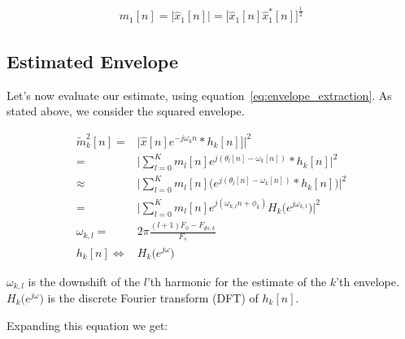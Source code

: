 \documentclass [11pt, proquest] {uwthesis}[2015/03/03]
\begin{document}
\begin{align}
\label{eq:square_root_relationship}
m_1[n] = \Big|\widehat{x}_1[n]\Big| = \Big[ \widehat{x}_1[n] \widehat{x}_1^*[n] \Big]^\frac{1}{2}
\end{align}

\subsection{Estimated Envelope}

Let's now evaluate our estimate, using equation~\ref{eq:envelope_extraction}.  As stated above, we consider the squared envelope.

\begin{align}
\tilde{m}_k^2[n] =& \Big| \widehat{x}[n]e^{-j \omega_kn} * h_k[n]]  \Big|^2 \nonumber \\
%
=& \Bigg|  \sum\limits_{l=0}^K m_l[n]e^{j(\theta_l[n] - \omega_k[n])}*h_k[n] \Bigg|^2 \nonumber \\
%
\approx& \Bigg|  \sum\limits_{l=0}^K m_l[n] \Big(e^{j(\theta_l[n] - \omega_k[n])}*h_k[n] \Big) \Bigg|^2 \nonumber \\
%
=& \Bigg|  \sum\limits_{l=0}^K m_l[n] e^{j(\omega_{k,l}n + \phi_k)} H_k\big(e^{j\omega_{k,l}}\big) \Bigg|^2 \\
%
\label{eq:downshift_radian_frequency}
\omega_{k,l} =& 2\pi\frac{(l+1)F_0 - F_{ds,k}}{F_s} \\
%
h_k[n] \Longleftrightarrow& H_k\big(e^{j\omega}\big)
\end{align}

$\omega_{k,l}$ is the downshift of the $l$'th harmonic for the estimate of the $k$'th envelope.  $H_k\big(e^{j\omega}\big)$ is the discrete Fourier transform (DFT) of $h_k[n]$.

Expanding this equation we get:
\end{document}
